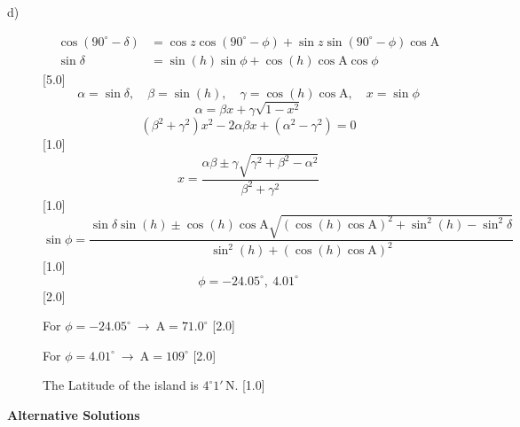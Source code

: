 \begin{description}
\item[d)]
  \begin{align*}
  \cos(90^\circ - \delta) &= \cos z\cos(90^\circ - \phi)
    + \sin z\sin(90^\circ - \phi)\cos\mathrm{A}\\
  \sin\delta &= \sin(h)\sin\phi + \cos(h)\cos\mathrm{A}\cos\phi
  \end{align*}
  \hfill[5.0]
  \[ \alpha = \sin\delta,\quad \beta = \sin(h),\quad
     \gamma = \cos(h)\cos\mathrm{A},\quad x = \sin\phi \]
  \[ \alpha = \beta x + \gamma\sqrt{1 - x^2} \]
  \[ (\beta^2 + \gamma^2)x^2 - 2\alpha\beta x + (\alpha^2 - \gamma^2) = 0 \]
  \hfill[1.0]
  \[ x = \frac{\alpha\beta \pm \gamma\sqrt{\gamma^2 + \beta^2 - \alpha^2}}
              {\beta^2 + \gamma^2} \]
  \hfill[1.0]
  \[ \sin\phi = \frac{\sin\delta\sin(h)
      \pm \cos(h)\cos\mathrm{A}
      \sqrt{(\cos(h)\cos\mathrm{A})^2 + \sin^2(h) - \sin^2\delta}}
     {\sin^2(h) + (\cos(h)\cos\mathrm{A})^2} \]
  \hfill[1.0]
  \[ \phi = -24.05^\circ,\ 4.01^\circ \]
  \hfill[2.0]

  For $\phi = -24.05^\circ\ \rightarrow\ \mathrm{A} = 71.0^\circ$
  \hfill[2.0]

  For $\phi = 4.01^\circ\ \rightarrow\ \mathrm{A} = 109^\circ$
  \hfill[2.0]

  The Latitude of the island is $4^\circ 1'$\,N. \hfill[1.0]
\end{description}

\textbf{Alternative Solutions}

